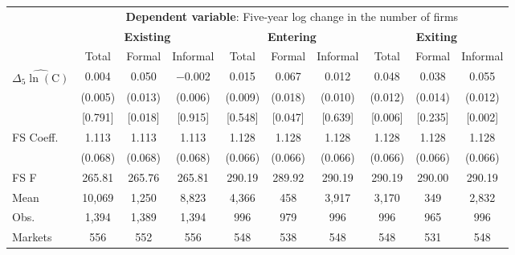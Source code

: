 \begin{threeparttable}
    \setlength{\tabcolsep}{3.5pt}
    \begin{tabular}{@{}l*{9}{c}@{}}
        \toprule
        & \multicolumn{9}{c}{\textbf{Dependent variable}: Five-year log change in the number of firms} \\
        \cmidrule(lr){2-10}
         & \multicolumn{3}{c}{\textbf{Existing}} & \multicolumn{3}{c}{\textbf{Entering}} & \multicolumn{3}{c}{\textbf{Exiting}} \\
        \cmidrule(lr){2-4} \cmidrule(lr){5-7} \cmidrule(lr){8-10}
        & Total & Formal & Informal & Total & Formal & Informal & Total & Formal & Informal \\
        \midrule
        $\widehat{\Delta_5\ln(\text{C})}$
        & 0.004 & 0.050\sym{***} & $-$0.002
        & 0.015 & 0.067\sym{***} & 0.012
        & 0.048\sym{***} & 0.038\sym{***} & 0.055\sym{***} \\
        & (0.005) & (0.013) & (0.006)
        & (0.009) & (0.018) & (0.010)
        & (0.012) & (0.014) & (0.012) \\
        & [0.791] & [0.018] & [0.915]
        & [0.548] & [0.047] & [0.639]
        & [0.006] & [0.235] & [0.002] \\
        \midrule
        FS Coeff. & 1.113 & 1.113 & 1.113 & 1.128 & 1.128 & 1.128 & 1.128 & 1.128 & 1.128 \\
                  & (0.068) & (0.068) & (0.068) & (0.066) & (0.066) & (0.066) & (0.066) & (0.066) & (0.066) \\
        FS F & 265.81 & 265.76 & 265.81 & 290.19 & 289.92 & 290.19 & 290.19 & 290.00 & 290.19 \\
        Mean & 10,069 & 1,250 & 8,823 & 4,366 & 458 & 3,917 & 3,170 & 349 & 2,832 \\
        Obs. & 1,394 & 1,389 & 1,394 & 996 & 979 & 996 & 996 & 965 & 996 \\
        Markets & 556 & 552 & 556 & 548 & 538 & 548 & 548 & 531 & 548 \\
        \bottomrule
    \end{tabular}
    \begin{tablenotes}[flushleft]
        \footnotesize

\end{tablenotes}
\end{threeparttable}
